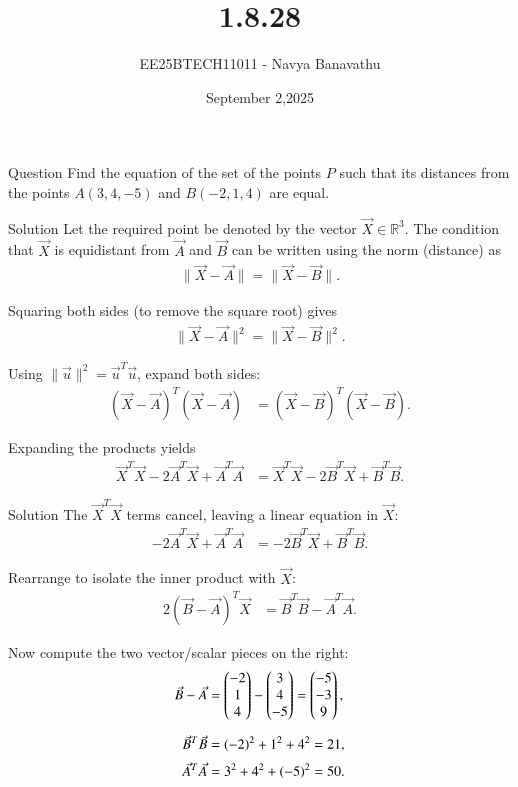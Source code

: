 \documentclass{beamer}
\title{1.8.28}
\date{September 2,2025}
\author{EE25BTECH11011 - Navya Banavathu}
\begin{document}
\frame{\titlepage}

\begin{frame}{Question}
Find the equation of the set of the points $P$ such that its distances 
from the points $A(3,4,-5)$ and $B(-2,1,4)$ are equal.\\
\end{frame}

\begin{frame}{Solution}
Let the required point be denoted by the vector $\Vec{X}\in\mathbb{R}^3$.  
The condition that $\Vec{X}$ is equidistant from $\Vec{A}$ and $\Vec{B}$ can be written using the norm (distance) as
\begin{align}
\lVert \Vec{X} - \Vec{A} \rVert = \lVert \Vec{X} - \Vec{B} \rVert.
\end{align}

Squaring both sides (to remove the square root) gives
\begin{align}
\lVert \Vec{X} - \Vec{A} \rVert^2 = \lVert \Vec{X} - \Vec{B} \rVert^2.
\end{align}

Using $\lVert \Vec{u}\rVert^2 = \Vec{u}^T\Vec{u}$, expand both sides:
\begin{align}
(\Vec{X}-\Vec{A})^T(\Vec{X}-\Vec{A}) &= (\Vec{X}-\Vec{B})^T(\Vec{X}-\Vec{B}).
\end{align}

Expanding the products yields
\begin{align}
\Vec{X}^T\Vec{X} - 2\Vec{A}^T\Vec{X} + \Vec{A}^T\Vec{A}
&= \Vec{X}^T\Vec{X} - 2\Vec{B}^T\Vec{X} + \Vec{B}^T\Vec{B}.
\end{align}

\end{frame}

\begin{frame}{Solution}
The $\Vec{X}^T\Vec{X}$ terms cancel, leaving a linear equation in $\Vec{X}$:
\begin{align}
-2\Vec{A}^T\Vec{X} + \Vec{A}^T\Vec{A} &= -2\Vec{B}^T\Vec{X} + \Vec{B}^T\Vec{B}.
\end{align}

Rearrange to isolate the inner product with $\Vec{X}$:
\begin{align}
2(\Vec{B}-\Vec{A})^T \Vec{X} &= \Vec{B}^T\Vec{B} - \Vec{A}^T\Vec{A}.
\end{align}

Now compute the two vector/scalar pieces on the right:
\begin{align}
\Vec{B}-\Vec{A} &= \begin{pmatrix}-2\\1\\4\end{pmatrix} - \begin{pmatrix}3\\4\\-5\end{pmatrix} = \begin{pmatrix}-5\\-3\\9\end{pmatrix}, \\[6pt]
\Vec{B}^T\Vec{B} &= (-2)^2 + 1^2 + 4^2 = 21, \\[2pt]
\Vec{A}^T\Vec{A} &= 3^2 + 4^2 + (-5)^2 = 50.
\end{align}


\end{frame}
\end{document}
